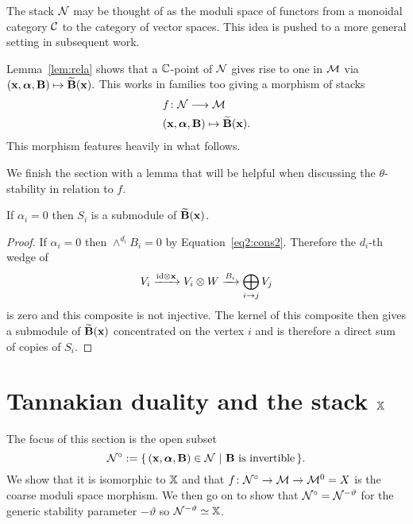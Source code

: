 \documentclass{amsart}
\newcommand{\balpha}{\boldsymbol{\alpha}}
\theoremstyle{definition}
\begin{document}
\begin{remark}
The stack $\mathcal{N}$ may be thought of as the moduli space of functors from a monoidal category $\mathcal{C}$ to the category of vector spaces.
This idea is pushed to a more general setting in subsequent work.
\end{remark}

Lemma~\ref{lem:rela} shows that a $\mathbb{C}$-point of $\mathcal{N}$ gives rise to one in $\mathcal{M}$ via $(\bfx, \balpha, \bfB) \mapsto \widetilde{\bfB}(\bfx).$
This works in families too giving a morphism of stacks
\begin{align*}
    & f \colon \cN \longrightarrow \cM \\
    & (\bfx, \balpha, \bfB) \mapsto \widetilde{\bfB}(\bfx).
\end{align*}
This morphism features heavily in what follows.

We finish the section with a lemma that will be helpful when discussing the $\theta$-stability in relation to $f$.

\begin{lemma}\label{lem:Si}
If $\alpha_i=0$ then $S_i$ is a submodule of $\widetilde{\mathbf{B}}(\mathbf{x})$.
\end{lemma}

\begin{proof}
If $\alpha_i=0$ then $\wedge^{d_i} B_i=0$ by Equation~\eqref{eq2:cons2}.
Therefore the $d_i$-th wedge of $$V_{i} \xrightarrow{\textup{id} \otimes \mathbf{x}} V_{i} \otimes W \xrightarrow{B_{i}} \bigoplus_{i \rightarrow j} V_j$$ is zero and this composite is not injective.
The kernel of this composite then gives a submodule of $\widetilde{\mathbf{B}}(\mathbf{x})$ concentrated on the vertex $i$ and is therefore a direct sum of copies of $S_i$.
\end{proof}


\section{Tannakian duality and the stack $\mathbb{X}$}

The focus of this section is the open subset $$\cN^\circ:= \{\,(\bfx, \balpha, \bfB) \in \cN \,\,|\,\, \bfB \text{ is invertible} \,\}.$$
We show that it is isomorphic to $\mathbb{X}$ and that $f \colon \mathcal{N}^\circ \rightarrow \mathcal{M} \rightarrow \mathcal{M}^0=X$ is the coarse moduli space morphism.
We then go on to show that $\mathcal{N}^\circ = \mathcal{N}^{-\vartheta}$ for the generic stability parameter $-\vartheta$ so $\mathcal{N}^{-\vartheta} \simeq \mathbb{X}$.
\end{document}
